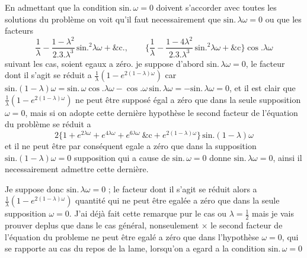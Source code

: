 \documentclass[11pt,a4paper]{article}
\begin{document}
En admettant que la condition $\text{sin.}\,\omega=0$ doivent s'accorder avec
toutes les solutions du problème on voit qu'il faut necessairement que
$\text{sin.}\,\lambda\omega=0$ ou que les facteurs
\[ \frac{1}{\lambda}-\frac{1-\lambda^2}{2.3.\lambda^3}\,\text{sin.}^2\lambda\omega+\text{\&c.},\qquad \Big\{\frac{1}{\lambda}-\frac{1-4\lambda^2}{2.3.\lambda^3}\,\text{sin.}^2\lambda\omega+\text{\&c}\Big\}\cos.\lambda\omega \]
suivant les cas, soient egaux a zéro. je suppose d'abord
$\text{sin.}\,\lambda\omega=0$, le facteur dont il s'agit se réduit a
$\frac{1}{\lambda}(1-e^{2(1-\lambda)\omega})$ car
$\text{sin.}(1-\lambda)\omega=\text{sin.}\,\omega\cos.\lambda\omega-\cos.\omega\,\text{sin.}\,\lambda\omega=-\text{sin.}\,\lambda\omega=0$,
et il est clair que $\frac{1}{\lambda}(1-e^{2(1-\lambda)\omega})$ ne peut
être supposé égal a zéro que dans la seule supposition $\omega=0$, mais si on
adopte cette dernière hypothèse le second facteur de l'équation du problème
se réduit a
\[ 2\big\{1+e^{2\lambda\omega}+e^{4\lambda\omega}+e^{6\lambda\omega}\ \text{\&c}+e^{2(1-\lambda)\omega}\big\}\,\text{sin.}(1-\lambda)\omega \]
 et il ne peut être par conséquent egale a zéro que dans la
supposition $\text{sin.}(1-\lambda)\omega=0$ supposition qui a cause de
$\text{sin.}\,\omega=0$ donne $\text{sin.}\,\lambda\omega=0$, ainsi il
necessairement admettre cette dernière.

Je suppose donc $\text{sin.}\,\lambda\omega=0$ ;  le facteur dont
il s'agit se réduit alors a
$\frac{1}{\lambda}(1-e^{2(1-\lambda)\omega})$ quantité qui ne peut être
egalée a zéro que dans la seule supposition $\omega=0$. J'ai déjà fait cette
remarque pur le cas ou $\lambda=\frac{1}{2}$ mais je vais prouver deplus
que dans le cas général, nonseulement $\times$ le second facteur de
l'équation du probleme ne peut être egalé a zéro que dans l'hypothèse
$\omega=0$, qui se rapporte au cas du repos de la lame, 
lorsqu'on a egard a la condition $\text{sin.}\,\omega=0$
\end{document}
